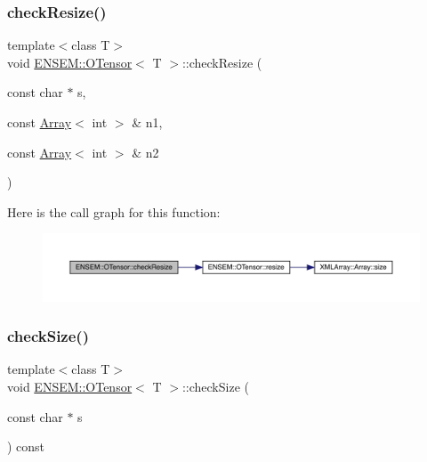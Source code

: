 \subsubsection{\texorpdfstring{checkResize()}{checkResize()}\hspace{0.1cm}{\footnotesize\ttfamily [4/4]}}
{\footnotesize\ttfamily template$<$class T$>$ \\
void \mbox{\hyperlink{classENSEM_1_1OTensor}{E\+N\+S\+E\+M\+::\+O\+Tensor}}$<$ T $>$\+::check\+Resize (\begin{DoxyParamCaption}\item[{const char $\ast$}]{s,  }\item[{const \mbox{\hyperlink{classXMLArray_1_1Array}{Array}}$<$ int $>$ \&}]{n1,  }\item[{const \mbox{\hyperlink{classXMLArray_1_1Array}{Array}}$<$ int $>$ \&}]{n2 }\end{DoxyParamCaption})\hspace{0.3cm}{\ttfamily [inline]}}

Here is the call graph for this function\+:
\nopagebreak
\begin{figure}[H]
\begin{center}
\leavevmode
\includegraphics[width=350pt]{da/d8a/classENSEM_1_1OTensor_a0f656f8ef2b19a258a8c86a4e80ea902_cgraph}
\end{center}
\end{figure}
\mbox{\label{classENSEM_1_1OTensor_a09bfbf9385ec1bbe5050d4df43850f63}} 
\subsubsection{\texorpdfstring{checkSize()}{checkSize()}\hspace{0.1cm}{\footnotesize\ttfamily [1/4]}}
{\footnotesize\ttfamily template$<$class T$>$ \\
void \mbox{\hyperlink{classENSEM_1_1OTensor}{E\+N\+S\+E\+M\+::\+O\+Tensor}}$<$ T $>$\+::check\+Size (\begin{DoxyParamCaption}\item[{const char $\ast$}]{s }\end{DoxyParamCaption}) const\hspace{0.3cm}{\ttfamily [inline]}}

